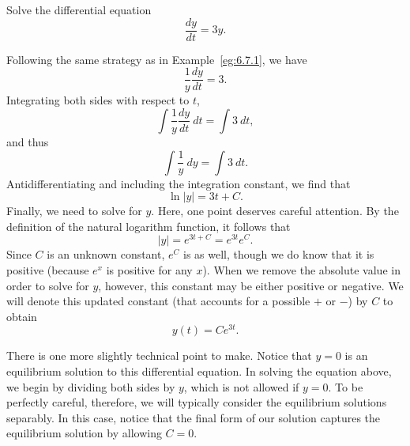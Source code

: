 
\begin{example} \label{eg:6.7.2} %
Solve the differential equation
$$\frac{dy}{dt} =3y.$$

\solution Following the same strategy as in Example~\ref{eg:6.7.1}, we have
$$  \frac 1y \frac{dy}{dt} = 3. $$
Integrating both sides with respect to $t$,
$$  \int \frac 1y\frac{dy}{dt}~dt = \int 3~dt,$$
and thus 
$$ \int \frac 1y~dy =  \int 3~dt.$$
Antidifferentiating and including the integration constant, we find that
$$  \ln|y| = 3t + C.$$
Finally, we need to solve for $y$.  Here, one point deserves careful
attention.  By the definition of the natural logarithm function, it follows that
$$
|y| = e^{3t+C} = e^{3t}e^C.
$$
Since $C$ is an unknown constant, $e^C$ is as well, though we do know
that it is positive (because $e^x$ is positive for any $x$).
When we remove the absolute value in order to solve for $y$, however, this constant may be either positive or
negative.  We 
will denote this updated constant (that accounts for a possible $+$ or $-$) by $C$ to obtain
$$
y(t) = Ce^{3t}.
$$

There is one more slightly technical point to make.  Notice that $y=0$
is an equilibrium solution to this differential equation.  In solving
the equation above, we begin by dividing both sides by $y$, which
is not allowed if $y=0$.  To be perfectly careful, therefore, we will typically
consider the equilibrium solutions separably.  In this case, notice that the final
form of our solution captures the equilibrium solution by allowing
$C=0$. 
\end{example}